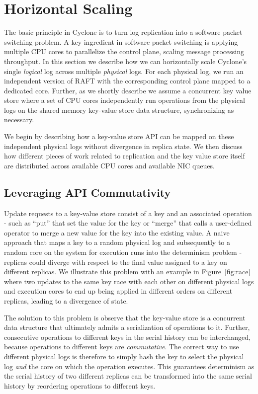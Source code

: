\documentclass[10pt, preprint, nonatbib]{sigplanconf}
\begin{document}
\section{Horizontal Scaling}
The basic principle in Cyclone is to turn log replication into a software packet
switching problem. A key ingredient in software packet switching is applying
multiple CPU cores to parallelize the control plane, scaling message processing
throughput. In this section we describe how we can horizontally scale Cyclone's
single \emph{logical} log across multiple \emph{physical} logs. For each
physical log, we run an independent version of RAFT with the corresponding
control plane mapped to a dedicated core. Further, as we shortly describe we
assume a concurrent key value store where a set of CPU cores independently run
operations from the physical logs on the shared memory key-value store data
structure, synchronizing as necessary.

We begin by describing how a key-value store API can be mapped on these
independent physical logs without divergence in replica state. We then discuss
how different pieces of work related to replication and the key value store
itself are distributed across available CPU cores and available NIC queues. 

\subsection{Leveraging API Commutativity}
Update requests to a key-value store consist of a key and an associated operation -
such as ``put'' that set the value for the key or ``merge'' that calls a
user-defined operator to merge a new value for the key into the existing value.
A naive approach that maps a key to a random physical log and subsequently to a
random core on the system for execution runs into the determinism problem -
replicas could diverge with respect to the final value assigned to a key on
different replicas. We illustrate this problem with an example in
Figure~\ref{fig:race} where two updates to the same key race with each other on
different physical logs and execution cores to end up being applied in different
orders on different replicas, leading to a divergence of state.

The solution to this problem is observe that the key-value store is a concurrent
data structure that ultimately admits a serialization of operations to
it. Further, consecutive operations to different keys in the serial history can
be interchanged, because operations to different keys are
\emph{commutative}. The correct way to use different physical logs is therefore
to simply hash the key to select the physical log \emph{and} the core on which
the operation executes. This guarantees determinism as the serial history of
two different replicas can be transformed into the same serial history by
reordering operations to different keys. 
\end{document}

